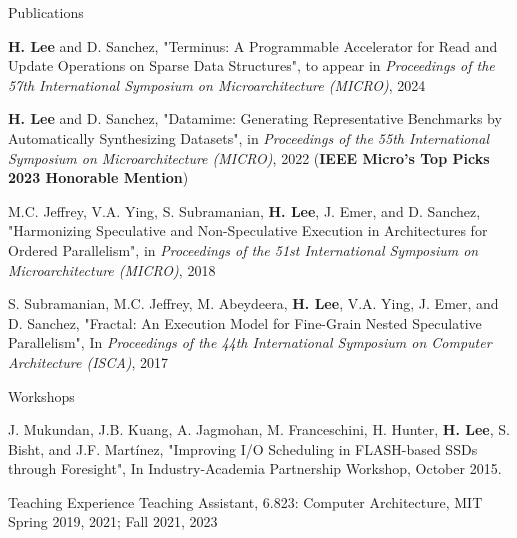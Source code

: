 \documentclass{resume} %
\begin{document}
\begin{rSection}{Publications}

{\bf H. Lee} and D. Sanchez,
"Terminus: A Programmable Accelerator for Read and Update Operations on Sparse Data Structures",
to appear in \textit{Proceedings of the 57th International Symposium on Microarchitecture (MICRO)}, 2024 %

{\bf H. Lee} and D. Sanchez,
"Datamime: Generating Representative Benchmarks by Automatically Synthesizing Datasets",
in \textit{Proceedings of the 55th International Symposium on Microarchitecture (MICRO)}, 2022 %
(\textbf{IEEE Micro's Top Picks 2023 Honorable Mention})

M.C. Jeffrey, V.A. Ying, S. Subramanian, {\bf H. Lee}, J. Emer, and D. Sanchez,
"Harmonizing Speculative and Non-Speculative Execution in Architectures for Ordered Parallelism",
in \textit{Proceedings of the 51st International Symposium on Microarchitecture (MICRO)}, 2018 %

S. Subramanian, M.C. Jeffrey, M. Abeydeera, {\bf H. Lee}, V.A. Ying, J. Emer, and D. Sanchez, 
"Fractal: An Execution Model for Fine-Grain Nested Speculative Parallelism",
In \textit{Proceedings of the 44th International Symposium on Computer Architecture (ISCA)}, 2017 %

\end{rSection}


\begin{rSection}{Workshops}

J. Mukundan, J.B. Kuang, A. Jagmohan, M. Franceschini, H. Hunter, {\bf H. Lee}, S. Bisht, and J.F. Martínez, "Improving I/O Scheduling in FLASH-based SSDs through Foresight", In Industry-Academia Partnership Workshop, October 2015.

\end{rSection}


\begin{rSection}{Teaching Experience}
Teaching Assistant, 6.823: Computer Architecture, MIT \hfill {Spring 2019, 2021; Fall 2021, 2023}

\end{rSection}
\end{document}
